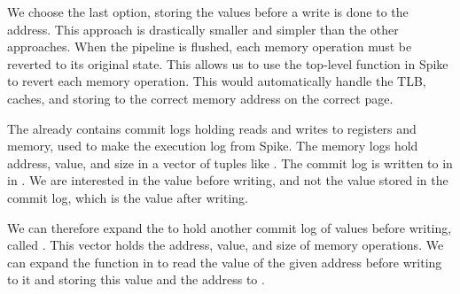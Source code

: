 
We choose the last option, storing the values before a write is done to the address. This approach is drastically smaller and simpler than the other approaches.
When the pipeline is flushed, each memory operation must be reverted to its original state. This allows us to use the top-level  function in Spike to revert each memory operation. This would automatically handle the TLB, caches, and storing to the correct memory address on the correct page.

The  already contains commit logs holding reads and writes to registers and memory, used to make the execution log from Spike. The memory logs hold address, value, and size in a vector of tuples like . The commit log is written to in  in . We are interested in the value before writing, and not the value stored in the commit log, which is the value after writing. 

We can therefore expand the  to hold another commit log of values before writing, called . This vector holds the address, value, and size of memory operations. We can expand the  function in  to read the value of the given address before writing to it and storing this value and the address to .



